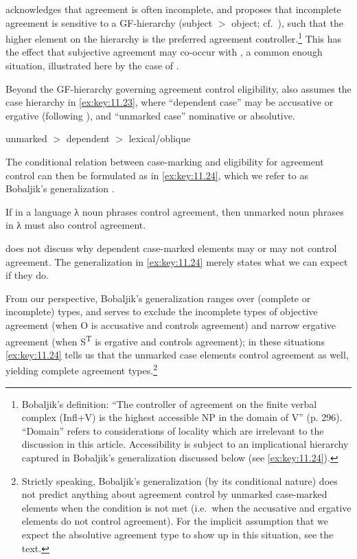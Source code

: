\documentclass[output=paper]{langsci/langscibook}
\begin{document}
\citet[296]{Bobaljik2008} acknowledges that agreement  is often
incomplete, and proposes that incomplete agreement is sensitive to a
\gls{GF}-hierarchy (subject $>$ object; cf.\ \citealt{Moravcsik1978}), such
that the higher element on the hierarchy is the preferred agreement
controller.\footnote{Bobaljik’s definition: \enquote{The controller of
    agreement on the finite verbal complex (Infl+V) is the highest accessible
NP in the domain of V} (p. 296). \enquote{Domain} refers to considerations of
locality which are irrelevant to the discussion in this article. Accessibility
is subject to an implicational hierarchy captured in Bobaljik’s generalization
discussed below (see \eqref{ex:key:11.24}).} This has the effect that
subjective agreement may co-occur with  , a common
enough situation, illustrated here by the case of .

Beyond the \gls{GF}-hierarchy governing agreement control eligibility,
\citet{Bobaljik2008} also assumes the case hierarchy in \eqref{ex:key:11.23},
where \enquote{dependent case} may be accusative or ergative (following
\citealt{Marantz1991}), and \enquote{unmarked case} nominative or absolutive.

\ea%
    \label{ex:key:11.23}
    unmarked  $>$  dependent  $>$  lexical/oblique
\z

The conditional relation between case-marking and eligibility for agreement
control can then be formulated as in \eqref{ex:key:11.24}, which we refer to as Bobaljik’s
generalization \citep[303]{Bobaljik2008}.

\ea%
    \label{ex:key:11.24}
    If in a language λ  noun phrases control agreement, then
    unmarked noun phrases in λ must also control agreement.
\z

\citet{Bobaljik2008} does not discuss why dependent case-marked elements may or
may not control agreement. The generalization in \eqref{ex:key:11.24} merely states what we can
expect if they do.

From our perspective, Bobaljik’s generalization ranges over (complete or
incomplete)  types, and serves to exclude the incomplete types of
objective agreement (when O is accusative and controls agreement) and narrow
ergative agreement (when S\textsuperscript{T} is ergative and controls
agreement); in these situations \eqref{ex:key:11.24} tells us that the unmarked case elements
control agreement as well, yielding complete agreement types.\footnote{Strictly
    speaking, Bobaljik’s generalization (by its conditional nature) does not
    predict anything about agreement control by unmarked case-marked elements
    when the condition is not met (i.e.\ when the accusative and ergative
    elements do not control agreement). For the implicit assumption that we
expect the absolutive agreement type to show up in this situation, see the
text.}
\end{document}
